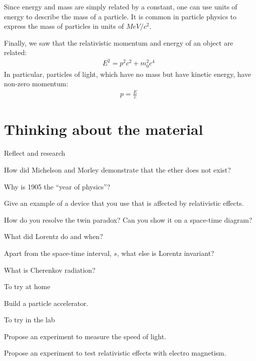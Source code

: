 \begin{chapterSummary}
Since energy and mass are simply related by a constant, one can use units of energy to describe the mass of a particle. It is common in particle physics to express the mass of particles in units of $\si{MeV/c^2}$.

Finally, we saw that the relativistic momentum and energy of an object are related:
\begin{align*}
E^2 = p^2c^2+m_0^2c^4
\end{align*}
In particular, particles of light, which have no mass but have kinetic energy, have non-zero momentum:
\begin{align*}
p=\frac{E}{c}
\end{align*}
\end{chapterSummary}


\newpage
\section{Thinking about the material}

\begin{chapteractivity}{Reflect and research}
	{
	\item How did Michelson and Morley demonstrate that the ether does not exist? 
	\item Why is 1905 the ``year of physics''?
	\item Give an example of a device that you use that is affected by relativistic effects.
	\item How do you resolve the twin paradox? Can you show it on a space-time diagram?
	\item What did Lorentz do and when?
	\item Apart from the space-time interval, $s$, what else is Lorentz invariant?
	\item What is Cherenkov radiation?
	}
\end{chapteractivity}

\begin{chapteractivity}{To try at home}
	{
	\item Build a particle accelerator.
	}
\end{chapteractivity}

\begin{chapteractivity}{To try in the lab}
	{
	 \item Propose an experiment to measure the speed of light.
	 \item Propose an experiment to test relativistic effects with electro magnetism.
	}
\end{chapteractivity}

